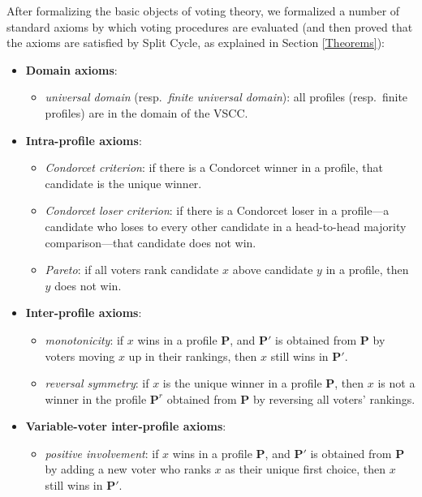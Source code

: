 \documentclass[runningheads]{llncs}
\begin{document}
After formalizing the basic objects of voting theory, we  formalized a number of standard axioms by which voting procedures are evaluated (and then proved that the axioms are satisfied by Split Cycle, as explained in Section \ref{Theorems}):
\begin{itemize}
\item[] \textbf{Domain axioms}:
\begin{itemize}
\item \textit{universal domain} (resp.~\textit{finite universal domain}): all profiles (resp.~finite profiles) are in the domain of the VSCC.\\
\end{itemize}
\item[] \textbf{Intra-profile axioms}:
\begin{itemize}
\item \textit{Condorcet criterion}: if there is a Condorcet winner in a profile, that candidate is the unique winner.
\item \textit{Condorcet loser criterion}: if there is a Condorcet loser in a profile---a candidate who loses to every other candidate in a head-to-head majority comparison---that candidate does not win.
\item \textit{Pareto}: if all voters rank candidate $x$ above candidate $y$ in a profile, then $y$ does not win.\\
\end{itemize}
\item[] \textbf{Inter-profile axioms}:
\begin{itemize}
\item \textit{monotonicity}: if $x$ wins in a profile $\mathbf{P}$, and $\mathbf{P}'$ is obtained from $\mathbf{P}$ by voters moving $x$ up in their rankings, then $x$ still wins in $\mathbf{P}'$.
\item \textit{reversal symmetry}: if $x$ is the unique winner in a profile $\mathbf{P}$, then $x$ is not a winner in the profile $\mathbf{P}^r$ obtained from $\mathbf{P}$ by reversing all voters' rankings.\\
\end{itemize}
\item[] \textbf{Variable-voter inter-profile axioms}:
\begin{itemize}
\item \textit{positive involvement}: if $x$ wins in a profile $\mathbf{P}$, and $\mathbf{P}'$ is obtained from $\mathbf{P}$ by adding a new voter who ranks $x$ as their unique first choice, then $x$ still wins in $\mathbf{P}'$.

\end{itemize}
\end{itemize}
\end{document}

